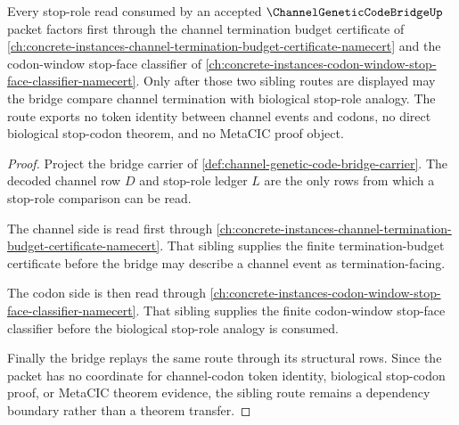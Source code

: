 \begin{theorem}
\label{thm:channel-genetic-code-bridge-codon-window-sibling-route}
Every stop-role read consumed by an accepted $\ChannelGeneticCodeBridgeUp$ packet factors first through the channel termination budget certificate of \autoref{ch:concrete-instances-channel-termination-budget-certificate-namecert} and the codon-window stop-face classifier of \autoref{ch:concrete-instances-codon-window-stop-face-classifier-namecert}. Only after those two sibling routes are displayed may the bridge compare channel termination with biological stop-role analogy. The route exports no token identity between channel events and codons, no direct biological stop-codon theorem, and no MetaCIC proof object.
\end{theorem}
\begin{proof}
Project the bridge carrier of \autoref{def:channel-genetic-code-bridge-carrier}. The decoded channel row $D$ and stop-role ledger $L$ are the only rows from which a stop-role comparison can be read.

The channel side is read first through \autoref{ch:concrete-instances-channel-termination-budget-certificate-namecert}. That sibling supplies the finite termination-budget certificate before the bridge may describe a channel event as termination-facing.

The codon side is then read through \autoref{ch:concrete-instances-codon-window-stop-face-classifier-namecert}. That sibling supplies the finite codon-window stop-face classifier before the biological stop-role analogy is consumed.

Finally the bridge replays the same route through its structural rows. Since the packet has no coordinate for channel-codon token identity, biological stop-codon proof, or MetaCIC theorem evidence, the sibling route remains a dependency boundary rather than a theorem transfer.
\end{proof}
